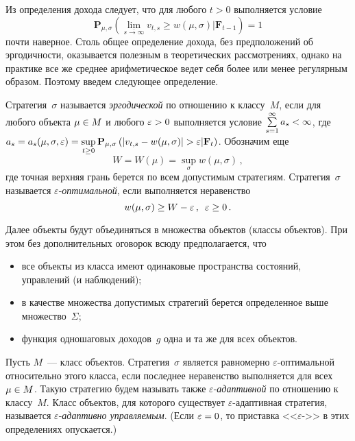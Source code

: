 \begin{multicols}{2}
  Из определения дохода следует, что для любого $t>0$ выполняется условие
  $$
  \mathbf{P}_{\mu,\sigma}\left( \lim\limits_{\overline{s\rightarrow\infty}} v_{t,s}\geq 
w(\mu,\sigma)\vert \mathbf{F}_{t-1}\right)=1
  $$
почти наверное.
  Столь общее определение дохода, без предположений об эргодичности, оказывается 
полезным в теоретических рассмотрениях, однако на практике все же среднее 
арифметическое ведет себя более или менее регулярным образом. Поэтому введем 
следующее определение.
{ %

}
  
  Стратегия~$\sigma$ называется \textit{эргодической} по отношению к классу~$M$, 
если для любого объекта $\mu\hm\in M$ и любого $\varepsilon\hm>0$ выполняется 
условие $\sum\limits_{s=1}^\infty a_s\hm<\infty$, где $a_s\hm= 
a_s(\mu,\sigma,\varepsilon)\hm=\sup\limits_{t\geq0} \mathbf{P}_{\mu,\sigma}\left( \left\vert 
v_{t,s}-w(\mu,\sigma)\right\vert >\varepsilon\vert \mathbf{F}_t\right)$. Обозначим еще
  $$
  W=W(\mu) =\sup\limits_\sigma w(\mu,\sigma)\,,
  $$
где точная верхняя грань берется по всем допустимым стратегиям. Стратегия~$\sigma$ 
называется $\varepsilon$-\textit{оп\-ти\-маль\-ной}, если выполняется неравенство
$$
w(\mu,\sigma)\geq W-\varepsilon\,,\enskip \varepsilon\geq 0\,.
$$
  
  Далее объекты будут объединяться в множества объектов (классы объектов). При этом 
без дополнительных оговорок всюду предполагается, что
  \begin{itemize}
  \item все объекты из класса имеют одинаковые пространства состояний, управлений (и 
наблюдений);
  \item в качестве множества допустимых стратегий берется определенное выше 
множество~$\Sigma$;
  \item функция одношаговых доходов~$g$ одна и та же для всех объектов.
  \end{itemize}
  
  Пусть $M$~--- класс объектов. Стратегия~$\sigma$ является равномерно 
  $\varepsilon$-оп\-ти\-маль\-ной относительно этого класса, если последнее неравенство 
выполняется для всех $\mu\hm\in M$. Такую стратегию будем называть также 
  $\varepsilon$-\textit{адап\-тив\-ной} по отношению к классу~$M$. Класс объектов, для 
которого существует $\varepsilon$-адап\-тив\-ная стратегия, называется 
  $\varepsilon$-\textit{адап\-тив\-но управ\-ля\-емым}. (Если $\varepsilon\hm=0$, то 
приставка <<$\varepsilon$->> в этих определениях опускается.)
  

\end{multicols}
